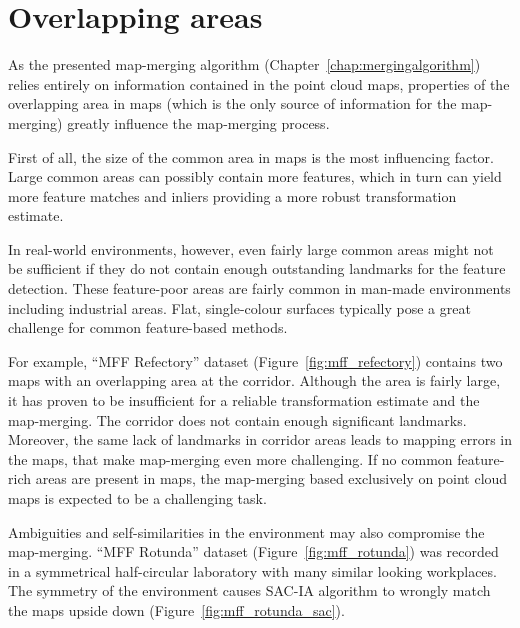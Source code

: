 \section{Overlapping areas}
\label{sec:mff-evaluation}

As the presented map-merging algorithm (Chapter~\ref{chap:mergingalgorithm}) relies entirely on information contained in the point cloud maps, properties of the overlapping area in maps (which is the only source of information for the map-merging) greatly influence the map-merging process.

First of all, the size of the common area in maps is the most influencing factor. Large common areas can possibly contain more features, which in turn can yield more feature matches and inliers providing a more robust transformation estimate.

In real-world environments, however, even fairly large common areas might not be sufficient if they do not contain enough outstanding landmarks for the feature detection. These feature-poor areas are fairly common in man-made environments including industrial areas. Flat, single-colour surfaces typically pose a great challenge for common feature-based methods.

For example, ``MFF Refectory'' dataset (Figure~\ref{fig:mff_refectory}) contains two maps with an overlapping area at the corridor. Although the area is fairly large, it has proven to be insufficient for a reliable transformation estimate and the map-merging. The corridor does not contain enough significant landmarks. Moreover, the same lack of landmarks in corridor areas leads to mapping errors in the maps, that make map-merging even more challenging. If no common feature-rich areas are present in maps, the map-merging based exclusively on point cloud maps is expected to be a challenging task.

Ambiguities and self-similarities in the environment may also compromise the map-merging. ``MFF Rotunda'' dataset (Figure~\ref{fig:mff_rotunda}) was recorded in a symmetrical half-circular laboratory with many similar looking workplaces. The symmetry of the environment causes \gls{SAC-IA} algorithm to wrongly match the maps upside down (Figure~\ref{fig:mff_rotunda_sac}).

